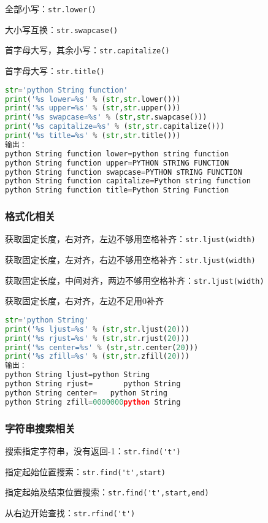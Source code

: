 全部小写：\verb|str.lower()|

大小写互换：\verb|str.swapcase()|

首字母大写，其余小写：\verb|str.capitalize()|

首字母大写：\verb|str.title()|

\begin{lstlisting}[language=python]
str='python String function'
print('%s lower=%s' % (str,str.lower()))
print('%s upper=%s' % (str,str.upper()))
print('%s swapcase=%s' % (str,str.swapcase()))
print('%s capitalize=%s' % (str,str.capitalize()))
print('%s title=%s' % (str,str.title()))
输出：
python String function lower=python string function
python String function upper=PYTHON STRING FUNCTION
python String function swapcase=PYTHON sTRING FUNCTION
python String function capitalize=Python string function
python String function title=Python String Function
\end{lstlisting}
\subsubsection{格式化相关}
获取固定长度，右对齐，左边不够用空格补齐：\verb|str.ljust(width)|

获取固定长度，左对齐，右边不够用空格补齐：\verb|str.ljust(width)|

获取固定长度，中间对齐，两边不够用空格补齐：\verb|str.ljust(width)|

获取固定长度，右对齐，左边不足用0补齐

\begin{lstlisting}[language=python]
str='python String'
print('%s ljust=%s' % (str,str.ljust(20)))
print('%s rjust=%s' % (str,str.rjust(20)))
print('%s center=%s' % (str,str.center(20)))
print('%s zfill=%s' % (str,str.zfill(20)))
输出：
python String ljust=python String       
python String rjust=       python String
python String center=   python String    
python String zfill=0000000python String

\end{lstlisting}

\subsubsection{字符串搜索相关}
搜索指定字符串，没有返回-1：\verb|str.find('t')|

指定起始位置搜索：\verb|str.find('t',start)|

指定起始及结束位置搜索：\verb|str.find('t',start,end)|

从右边开始查找：\verb|str.rfind('t')|


